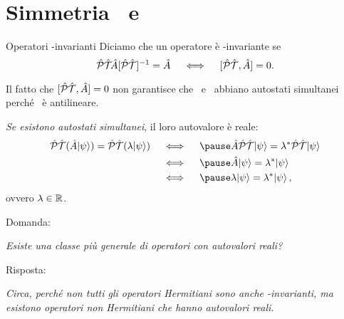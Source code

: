 \section{Simmetria \PT\ e \CPT}
\begin{frame}{Operatori \PT-invarianti}
    Diciamo che un operatore è \hPT-invariante se
    \begin{equation*}
        \PTtransform{\hA} = \hA
        \quad\iff\quad
        \comm*{\hPT}{\hA}\! = 0\myperiod
    \end{equation*}
    
    \pause
    Il fatto che $\comm*{\hPT}{\hA}\! = 0$ non garantisce che \hA\ e \hPT\ abbiano autostati simultanei perché \hPT\ è antilineare.

    \pause
    \emph{Se esistono autostati simultanei}, il loro autovalore è reale:
    \begin{align*} 
        \hPT\pqty*{\hA\!\ket{\psi}}\! = \hPT\pqty{\lambda\!\ket{\psi}}
        \quad&\iff\quad
        \pause
        \hA\hPT\!\ket{\psi} = \lambda^*\hPT\!\ket{\psi} \\
        \quad&\iff\quad
        \pause
        \hA\!\ket{\psi} = \lambda^*\!\ket{\psi} \\
        \quad&\iff\quad
        \pause
        \lambda\!\ket{\psi} = \lambda^*\!\ket{\psi}
        \mycomma
    \end{align*}
    \pause
    ovvero $\lambda \in \mathbb{R}$.
\end{frame}

\begin{frame}
    Domanda:
    \begin{center}
        {\it Esiste una classe più generale di operatori con autovalori reali?}
    \end{center}
    Risposta:
    \pause
    \begin{center}
        {\it Circa, perché non tutti gli operatori Hermitiani sono \emph{anche} \PT-invarianti, ma esistono operatori \emph{non Hermitiani} che hanno autovalori reali.}
    \end{center}
    \pause
    \begin{figure}
        \centering
    \end{figure}
\end{frame}

